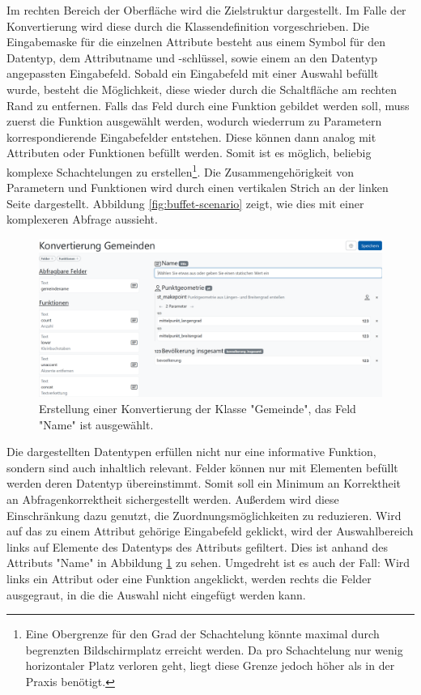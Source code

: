 Im rechten Bereich der Oberfläche wird die Zielstruktur dargestellt. Im Falle der Konvertierung wird diese durch die Klassendefinition vorgeschrieben. Die Eingabemaske für die einzelnen Attribute besteht aus einem Symbol für den Datentyp, dem Attributname und -schlüssel, sowie einem an den Datentyp angepassten Eingabefeld. Sobald ein Eingabefeld mit einer Auswahl befüllt wurde, besteht die Möglichkeit, diese wieder durch die Schaltfläche am rechten Rand zu entfernen. Falls das Feld durch eine Funktion gebildet werden soll, muss zuerst die Funktion ausgewählt werden, wodurch wiederrum zu Parametern korrespondierende Eingabefelder entstehen. Diese können dann analog mit Attributen oder Funktionen befüllt werden. Somit ist es möglich, beliebig komplexe Schachtelungen zu erstellen\footnote{Eine Obergrenze für den Grad der Schachtelung könnte maximal durch begrenzten Bildschirmplatz erreicht werden. Da pro Schachtelung nur wenig horizontaler Platz verloren geht, liegt diese Grenze jedoch höher als in der Praxis benötigt. }. Die Zusammengehörigkeit von Parametern und Funktionen wird durch einen vertikalen Strich an der linken Seite dargestellt. Abbildung \ref{fig:buffet-scenario} zeigt, wie dies mit einer komplexeren Abfrage aussieht.

\begin{figure}[ht]
  \begin{center}
    \includegraphics[width=.95\textwidth]{assets/buffet-selected.png}
  \end{center}
  \caption{Erstellung einer Konvertierung der Klasse "Gemeinde", das Feld "Name" ist ausgewählt.}
  \label{fig:buffet-selected}
\end{figure}

Die dargestellten Datentypen erfüllen nicht nur eine informative Funktion, sondern sind auch inhaltlich relevant. Felder können nur mit Elementen befüllt werden deren Datentyp übereinstimmt. Somit soll ein Minimum an Korrektheit an Abfragenkorrektheit sichergestellt werden. Außerdem wird diese Einschränkung dazu genutzt, die Zuordnungsmöglichkeiten zu reduzieren. Wird auf das zu einem Attribut gehörige Eingabefeld geklickt, wird der Auswahlbereich links auf Elemente des Datentyps des Attributs gefiltert. Dies ist anhand des Attributs "Name" in Abbildung \ref{fig:buffet-selected} zu sehen. Umgedreht ist es auch der Fall: Wird links ein Attribut oder eine Funktion angeklickt, werden rechts die Felder ausgegraut, in die die Auswahl nicht eingefügt werden kann. 

